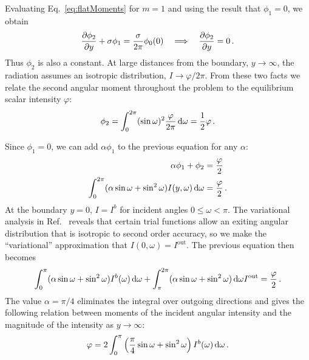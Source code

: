Evaluating Eq.~\eqref{eq:flatMoments} for $m=1$ and using the result that
$\phi_{1}=0$, we obtain
\begin{equation*}
  \frac{\partial \phi_{2}}{\partial y}
  + \sigma \phi_{1}
  = \frac{\sigma}{2\pi} \phi_{0} (0)
  \quad \Longrightarrow \quad
  \frac{\partial \phi_{2}}{\partial y} = 0\,.
\end{equation*}
Thus $\phi_{2}$ is also a constant. At large distances from the boundary,
$y\to\infty$, the radiation assumes an isotropic distribution,
$I\to\varphi/2\pi$. From these two facts we relate the second angular moment
throughout the problem to the equilibrium scalar intensity $\varphi$:
\begin{equation*}
  \phi_{2} = \int_{0}^{2\pi} (\sin\omega)^2 \frac{\varphi}{2\pi} \mathop{}\!\mathrm{d}\omega
  = \frac{1}{2} \varphi\,.
\end{equation*}

Since $\phi_1=0$, we can add $\alpha \phi_1$ to the previous equation for any
$\alpha$:
\begin{align*}
 \alpha\phi_1 + \phi_{2} &= \frac{\varphi}{2} \\
 \int_{0}^{2\pi} (\alpha \sin\omega + \sin^2\omega)
 I(y,\omega) \mathop{}\!\mathrm{d}\omega
 &= \frac{\varphi}{2}\,.
\end{align*}
At the boundary $y=0$, $I=I^b$ for incident angles $0 \le \omega < \pi$.
The variational analysis in Ref.~\cite{Mal1991} reveals that certain trial functions
allow an exiting angular distribution that is isotropic to second order accuracy,
so we make the ``variational'' approximation that $I(0,\omega)=I^\text{out}$.
The previous equation then becomes
\begin{equation*}
 \int_{0}^{\pi} (\alpha \sin\omega + \sin^2\omega)
 I^b(\omega) \mathop{}\!\mathrm{d}\omega
 + \int_{\pi}^{2\pi} (\alpha \sin\omega + \sin^2\omega)\mathop{}\!\mathrm{d}\omega I^\text{out}
 = \frac{\varphi}{2}\,.
\end{equation*}
The value $\alpha=\pi/4$ eliminates the integral over outgoing directions and
gives the following relation between moments of the incident angular
intensity and the magnitude of the intensity as $y\to\infty$:
\begin{equation}\label{eq:varBoundary}
 \varphi = 2\int_{0}^{\pi} \left( \frac{\pi}{4} \sin\omega + \sin^2\omega \right)
 I^b(\omega) \mathop{}\!\mathrm{d}\omega
 \,.
\end{equation}

